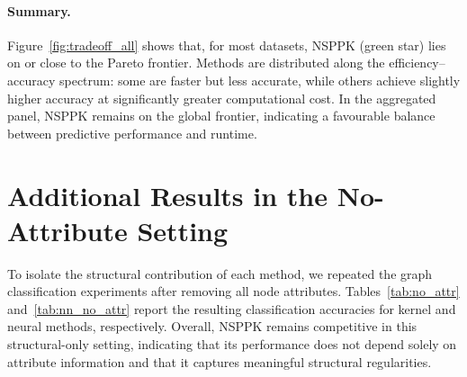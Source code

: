 \paragraph{Summary.}
Figure~\ref{fig:tradeoff_all} shows that, for most datasets, NSPPK
(green star) lies on or close to the Pareto frontier. Methods are distributed
along the efficiency--accuracy spectrum: some are faster but less accurate,
while others achieve slightly higher accuracy at significantly greater
computational cost. In the aggregated panel, NSPPK remains on the global
frontier, indicating a favourable balance between predictive performance and
runtime.

\section{Additional Results in the No-Attribute Setting}
\label{appendix:no_attr}

To isolate the structural contribution of each method, we repeated the
graph classification experiments after removing all node attributes.
Tables~\ref{tab:no_attr} and~\ref{tab:nn_no_attr} report the resulting
classification accuracies for kernel and neural methods, respectively.
Overall, NSPPK remains competitive in this structural-only setting,
indicating that its performance does not depend solely on attribute
information and that it captures meaningful structural regularities.

